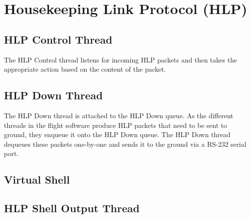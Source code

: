%
\section{Housekeeping Link Protocol (HLP)}
\hrulefill
\subsection{HLP Control Thread}
The HLP Control thread listens for incoming HLP packets and then takes the appropriate action based on the content of the packet.

\subsection{HLP Down Thread}
The HLP Down thread is attached to the HLP Down queue. As the different threads in the flight software produce HLP packets that need to be sent to ground, they enqueue it onto the HLP Down queue. The HLP Down thread dequeues these packets one-by-one and sends it to the ground via a RS-232 serial port.

\subsection{Virtual Shell}
\subsection{HLP Shell Output Thread}

